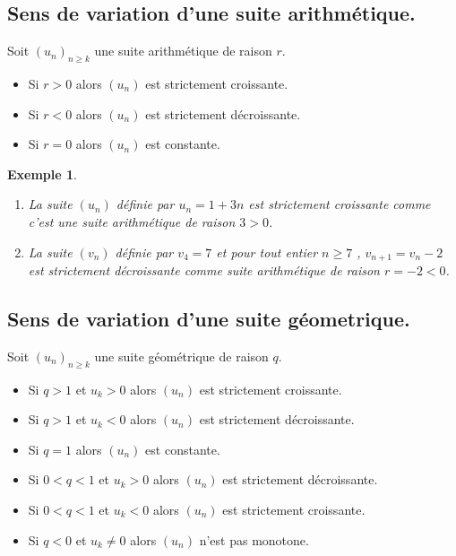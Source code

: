 \documentclass[a4paper,11pt]{article}
\theoremstyle{break}
\newcounter{enonce}
\newtheorem{exemple}[enonce]{Exemple}
\begin{document}
 \subsection{Sens de variation d'une suite arithmétique.}
 
 \begin{theorem}
  Soit $(u_n)_{n \geq k}$ une suite arithmétique de raison $r$.
  \begin{itemize}
   \item Si $r >0$ alors $(u_n)$ est strictement croissante.
   \item Si $r<0$ alors $(u_n)$ est strictement décroissante.
   \item Si $r=0$ alors $(u_n)$ est constante.
  \end{itemize}
 \end{theorem}
 
 \begin{exemple}
    
    \begin{enumerate}
     \item La suite $(u_n)$ définie par $u_n=1+3n$ est strictement croissante comme 
     c'est une suite arithmétique de raison $3>0$.
     \item La suite $(v_n)$ définie par $v_4=7$ et pour tout entier $n \geq 7$
     , $v_{n+1}=v_n -2$ est strictement décroissante comme suite arithmétique de raison $r=-2<0$.
    \end{enumerate}
 \end{exemple}
 
   \subsection{Sens de variation d'une suite géometrique.}
 
 \begin{theorem}
  Soit $(u_n)_{n \geq k}$ une suite géométrique de raison $q$.
  \begin{itemize}
   \item Si $q > 1$ et $u_k>0$ alors $(u_n)$ est strictement croissante.
   \item Si $q > 1$ et $u_k<0$ alors $(u_n)$ est strictement décroissante.
   \item Si $q = 1$ alors $(u_n)$ est constante.
   \item Si $0 < q < 1$ et $u_k>0$ alors $(u_n)$ est strictement décroissante.
   \item Si $0 < q < 1$ et $u_k<0$ alors $(u_n)$ est strictement croissante.
   \item Si $q < 0$ et $u_k \neq 0$ alors $(u_n)$ n'est pas monotone.
  \end{itemize}
 \end{theorem}
 
\end{document}

